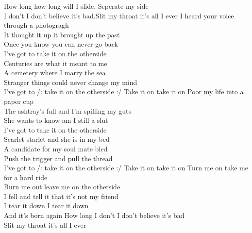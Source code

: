 \cho
{}How long how long will I slide. Seperate my side\\
 I don't I don't believe it's bad.Slit my throat it's all I ever
\ve
{}I heard your voice through a photogragh\\
It thought it up it brought up the past\\
Once you know you can never go back \\
I've got to take it on the otherside\\
Centuries are what it meant to me\\
A cemetery where I marry the sea\\
Stranger things could never change my mind\\
I've got to /: take it on the otherside :/ Take it on take it on
\ve
Poor my life into a paper cup\\
The ashtray's full and I'm spilling my guts\\
She wants to know am I still a slut \\
I've got to take it on the otherside\\
Scarlet starlet and she is in my bed\\
A candidate for my soul mate bled\\
Push the trigger and pull the thread\\
I've got to /: take it on the otherside :/ Take it on take it on
\ve
{}Turn me on take me for a hard ride\\
Burn me out leave me on the otherside\\
I fell and tell it that it's not my friend \\
I tear it down I tear it down \\
And it's born again 
How long I don't I don't believe it's bad\\
Slit my throat it's all I ever
\esong
